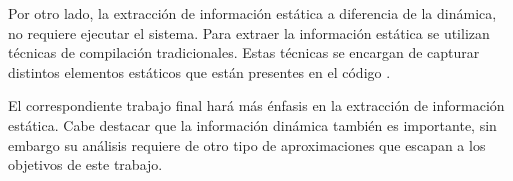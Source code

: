 \documentclass[a4paper,12pt]{article}
\begin{document}


\hspace{0.5cm}Por otro lado, la extracción de información estática a diferencia de la dinámica, no requiere ejecutar el sistema. Para extraer la información estática se utilizan técnicas de compilación tradicionales. Estas técnicas se encargan de capturar distintos elementos estáticos que están presentes en el código \cite{TERD01, AHUL06}.






\hspace{0.5cm} El correspondiente trabajo final hará más énfasis en la extracción de información estática. Cabe destacar que la información dinámica también es importante, sin embargo su análisis requiere de otro tipo de aproximaciones que escapan a los objetivos de este trabajo. 
\end{document}
